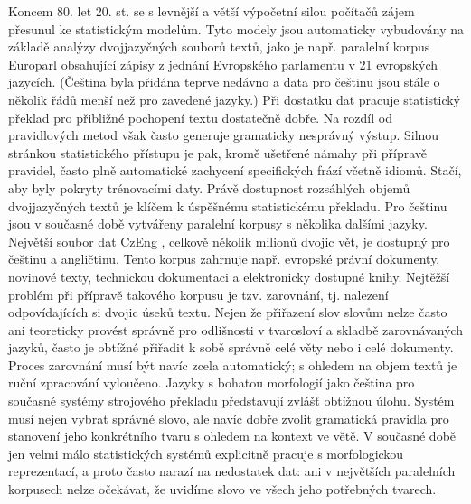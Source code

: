 \begin{multicols}{2}
Koncem 80. let 20. st. se s levnější a větší výpočetní silou počítačů zájem přesunul ke statistickým modelům. Tyto modely jsou automaticky vybudovány na základě analýzy dvojjazyčných souborů textů, jako je např. paralelní korpus Europarl obsahující zápisy z jednání Evropského parlamentu v 21 evropských jazycích. (Čeština byla přidána teprve nedávno a data pro češtinu jsou stále o několik řádů menší než pro zavedené jazyky.) Při dostatku dat pracuje statistický překlad pro přibližné pochopení textu dostatečně dobře. Na rozdíl od pravidlových metod však často generuje gramaticky nesprávný výstup. Silnou stránkou statistického přístupu je pak, kromě ušetřené námahy při přípravě pravidel, často plně automatické zachycení specifických frází včetně idiomů. Stačí, aby byly pokryty trénovacími daty. Právě dostupnost rozsáhlých objemů dvojjazyčných textů je klíčem k úspěšnému statistickému překladu. Pro češtinu jsou v současné době vytvářeny paralelní korpusy s několika dalšími jazyky. Největší soubor dat CzEng \cite{Note20}, celkově několik milionů dvojic vět, je dostupný pro češtinu a angličtinu. Tento korpus zahrnuje např. evropské právní dokumenty, novinové texty, technickou dokumentaci a elektronicky dostupné knihy. Nejtěžší problém při přípravě takového korpusu je tzv. zarovnání, tj. nalezení odpovídajících si dvojic úseků textu. Nejen že přiřazení slov slovům nelze často ani teoreticky provést správně pro odlišnosti v tvarosloví a skladbě zarovnávaných jazyků, často je obtížné přiřadit k sobě správně celé věty nebo i celé dokumenty. Proces zarovnání musí být navíc zcela automatický; s ohledem na objem textů je ruční zpracování vyloučeno. Jazyky s bohatou morfologií jako čeština pro současné systémy strojového překladu představují zvlášť obtížnou úlohu. Systém musí nejen vybrat správné slovo, ale navíc dobře zvolit gramatická pravidla pro stanovení jeho konkrétního tvaru s ohledem na kontext ve větě. V současné době jen velmi málo statistických systémů explicitně pracuje s morfologickou reprezentací, a proto často narazí na nedostatek dat: ani v největších paralelních korpusech nelze očekávat, že uvidíme slovo ve všech jeho potřebných tvarech.


\end{multicols}

